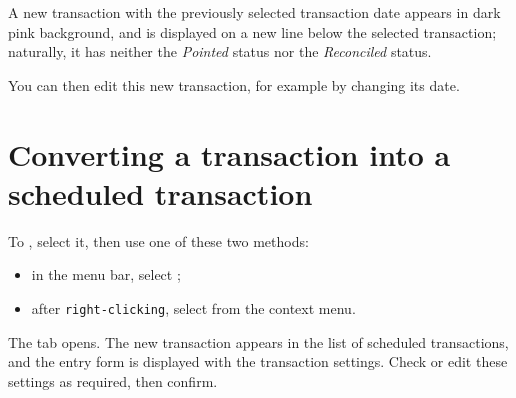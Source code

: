 A new transaction with the previously selected transaction date appears in \colorbox[RGB]{245,155,155}{dark pink background}, and is displayed on a new line below the selected transaction; naturally, it has neither the \emph{Pointed} status nor the \emph{Reconciled} status.

You can then edit this new transaction, for example by changing its date.


\section{Converting a transaction into a scheduled transaction\label{transactions-schedule}}

To , select it, then use one of these two methods:
\begin{itemize}
	\item in the menu bar, select ;
	\item after \texttt{right-clicking}, select  from the context menu.
\end{itemize}

The  tab opens. The new transaction appears in the list of scheduled transactions, and the entry form is displayed with the transaction settings. Check or edit these settings as required, then confirm.


